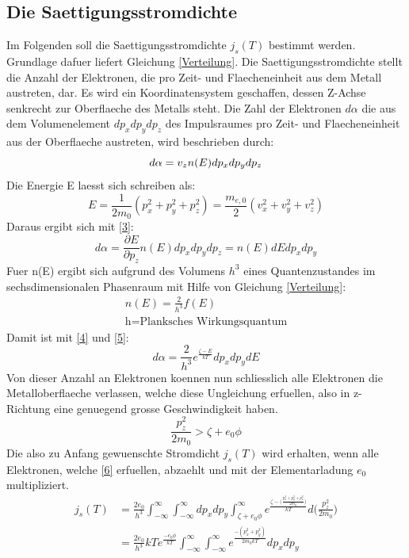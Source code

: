 \subsection{Die Saettigungsstromdichte}
Im Folgenden soll die Saettigungsstromdichte $j_s(T)$ bestimmt werden. Grundlage dafuer liefert Gleichung \ref{Verteilung}. Die Saettigungsstromdichte stellt die Anzahl der Elektronen, die pro Zeit- und Flaecheneinheit aus dem Metall austreten, dar. Es wird ein Koordinatensystem geschaffen, dessen Z-Achse senkrecht zur Oberflaeche des Metalls steht. Die Zahl der Elektronen $d\alpha$ die aus dem Volumenelement $dp_xdp_ydp_z$ des Impulsraumes pro Zeit- und Flaecheneinheit aus der Oberflaeche austreten, wird beschrieben durch:
\begin{equation}
    d\alpha=v_zn(E)dp_xdp_ydp_z \label{3}\\
\end{equation}
Die Energie E laesst sich schreiben als:
\begin{equation}
    E=\frac{1}{2m_0}(p_x^2+p_y^2+p_z^2)=\frac{m_{e,0}}{2}(v_x^2+v_y^2+v_z^2)
\end{equation}
Daraus ergibt sich mit \ref{3}:
\begin{equation}
    d\alpha=\frac{\partial E}{\partial p_z}n(E)dp_xdp_ydp_z=n(E)dEdp_xdp_y \label{4}
\end{equation}
Fuer n(E) ergibt sich aufgrund des Volumens $h^3$ eines Quantenzustandes im sechsdimensionalen Phasenraum mit Hilfe von Gleichung \ref{Verteilung}:
\begin{align}
    n(E)=\frac{2}{h^3}f(E) \label{5}\\
    \text{h=Planksches Wirkungsquantum}\nonumber
\end{align}
Damit ist mit \ref{4} und \ref{5}:
\begin{equation}
    d\alpha=\frac{2}{h^3}e^{\frac{\zeta-E}{kT}}dp_xdp_ydE \nonumber
\end{equation}
Von dieser Anzahl an Elektronen koennen nun schliesslich alle Elektronen die Metalloberflaeche verlassen, welche diese Ungleichung erfuellen, also in z-Richtung eine genuegend grosse Geschwindigkeit haben. 
\begin{equation}
    \frac{p_z^2}{2m_0}>\zeta+e_0\phi \label{6}
\end{equation}
Die also zu Anfang gewuenschte Stromdicht $j_s(T)$ wird erhalten, wenn alle Elektronen, welche \ref{6} erfuellen, abzaehlt und mit der Elementarladung $e_0$ multipliziert. 
\begin{align*}
j_s(T)&=\frac{2e_0}{h^3}\int_{-\infty}^{\infty} \int_{-\infty}^{\infty} dp_xdp_y \int_{\zeta+e_0\phi}^{\infty}e^{\frac{\zeta-\bigg(\frac{p_x^2+p_y^2+p_z^2}{2m_0}\bigg)}{kT}}d\Big(\frac{p_z^2}{2m_0}\Big)\\
&=\frac{2e_0}{h^3}kTe^{\frac{-e_0\phi}{kT}}\int_{-\infty}^{\infty} \int_{-\infty}^{\infty}e^{\frac{-(p_x^2+p_y^2)}{2m_0kT}}dp_xdp_y
\end{align*}
